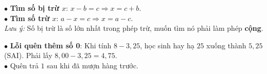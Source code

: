 \documentclass[14pt,a4paper,oneside]{extbook}
\begin{document}
\vspace{3mm}

\noindent
\begin{minipage}[t]{0.54\textwidth}
  \begin{tcolorbox}[
    enhanced,
    title={\footnotesize\bfseries\color{white}\faSearch\ Tìm thành phần chưa biết trong phép trừ},
    colback=green!3!white,
    colframe=green!60!black,
    arc=2.5mm, boxrule=0.8pt, top=1.8mm, bottom=1.8mm, left=2.2mm, right=2.2mm
  ]
    \footnotesize
    $\bullet$ \textbf{Tìm số bị trừ $x$}: $x - b = c \Rightarrow x = c + b$.\\
    $\bullet$ \textbf{Tìm số trừ $x$}: $a - x = c \Rightarrow x = a - c$.\\
    \textit{Lưu ý:} Số bị trừ là số lớn nhất trong phép trừ, muốn tìm nó phải làm phép \textbf{cộng}.
  \end{tcolorbox}
\end{minipage}%
\hfill
\begin{minipage}[t]{0.44\textwidth}
  \begin{tcolorbox}[
    enhanced,
    title={\footnotesize\bfseries\color{white}\faExclamationTriangle\ Mẹo tránh bẫy trắc nghiệm},
    colback=red!2!white,
    colframe=red!70!black,
    arc=2.5mm, boxrule=0.8pt, top=1.8mm, bottom=1.8mm, left=2.2mm, right=2.2mm
  ]
    \footnotesize
    $\bullet$ \textbf{Lỗi quên thêm số 0}: Khi tính $8 - 3,25$, học sinh hay hạ $25$ xuống thành $5,25$ (SAI). Phải lấy $8,00 - 3,25 = 4,75$.\\
    $\bullet$ Quên trả $1$ sau khi đã mượn hàng trước.
  \end{tcolorbox}
\end{minipage}
\end{document}
